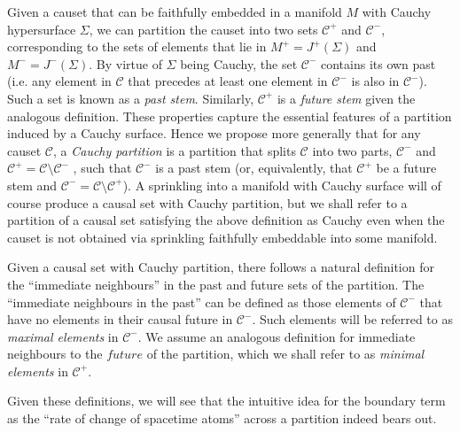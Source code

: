 \documentclass[12pt]{article}
\newcommand{\IGNORE}[1]{}
\begin{document}
Given a causet that can be faithfully embedded in a manifold $M$ with Cauchy hypersurface $\Sigma$, we can partition the causet into two sets $\mathcal{C}^+$ and $\mathcal{C}^-$, corresponding to the sets of elements that lie in $M^+=J^+(\Sigma)$ and $M^-=J^-(\Sigma)$. By virtue of $\Sigma$ being Cauchy, the set $\mathcal C^-$ contains its own past (i.e. any element in $\mathcal C$ that precedes at least one element in $\mathcal{C}^-$ is also in $\mathcal{C}^-$). Such a set is known as a \emph{past stem}. Similarly, $\mathcal C^+$ is a \emph{future stem} given the analogous definition. These properties capture the essential features of a partition induced by a Cauchy surface. Hence we propose more generally that for any causet $\mathcal C$, a \emph{Cauchy partition} is a partition that splits $\mathcal{C}$ into two parts, $\mathcal{C}^-$ and $\mathcal{C}^+=\mathcal{C}\setminus\mathcal{C}^-$ \IGNORE{($\mathcal{C}=\mathcal{C}^-\cup\mathcal{C}^+$)}, such that $\mathcal{C}^-$ is a past stem (or, equivalently, that $\mathcal{C}^+$ be a future stem and $\mathcal{C}^- = \mathcal{C}\setminus\mathcal{C}^+$). A sprinkling into a manifold with Cauchy surface will of course produce a causal set with Cauchy partition, but we shall refer to a partition of a causal set satisfying the above definition as Cauchy even when the causet is not obtained via sprinkling faithfully embeddable into some manifold.

Given a causal set with Cauchy partition, there follows a natural definition for the ``immediate neighbours'' in the past and future sets of the partition. The ``immediate neighbours in the past'' can be defined as those elements of $\mathcal{C}^-$ that have no elements in their causal future in $\mathcal{C}^-$. Such elements will be referred to as \textit{maximal elements} in $\mathcal{C}^-$. We assume an analogous definition for immediate neighbours to the $future$ of the partition, which we shall refer to as \emph{minimal elements} in $\mathcal{C}^+$. 

Given these definitions, we will see that the intuitive idea for the boundary term as the ``rate of change of spacetime atoms'' across a partition indeed bears out. \\
\end{document}

